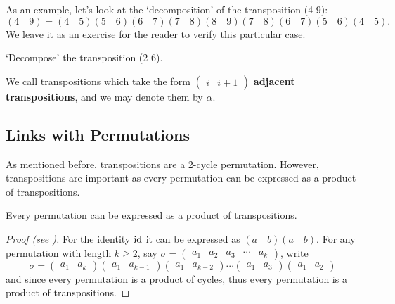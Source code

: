\begin{example}
    As an example, let's look at the `decomposition' of the transposition (4 9):
    \[
        (4\quad 9) = (4\quad 5)(5\quad 6)(6\quad 7)(7\quad 8)(8\quad 9)(7\quad 8)(6\quad 7)(5\quad 6)(4\quad 5).
    \]
    We leave it as an exercise for the reader to verify this particular case.
\end{example}
\begin{exercise}
    `Decompose' the transposition (2 6).
\end{exercise}
\begin{remark}
    We call transpositions which take the form $\begin{pmatrix}i&i+1\end{pmatrix}$ \textbf{adjacent transpositions}, and we may denote them by $\alpha$.
\end{remark}

\subsection{Links with Permutations}
As mentioned before, transpositions are a 2-cycle permutation. However, transpositions are important as every permutation can be expressed as a product of transpositions.
\begin{lemma}\label{lemma-permutations-as-product-of-transpositions}
    Every permutation can be expressed as a product of transpositions.
\end{lemma}
\begin{proof}[Proof (see {\cite[\S 80 Corollary]{clark_1984}})]
    For the identity $\mathrm{id}$ it can be expressed as $(a\quad b)(a \quad b)$. For any permutation with length $k \geq 2$, say $\sigma = \begin{pmatrix}a_1 & a_2 & a_3 & \cdots & a_k\end{pmatrix}$, write
    \[
        \sigma = \begin{pmatrix}a_1 & a_k\end{pmatrix}\begin{pmatrix}a_1 & a_{k-1}\end{pmatrix}\begin{pmatrix}a_1 & a_{k-2}\end{pmatrix}\cdots\begin{pmatrix}a_1 & a_3\end{pmatrix}\begin{pmatrix}a_1 & a_2\end{pmatrix}
    \]
    and since every permutation is a product of cycles, thus every permutation is a product of transpositions.
\end{proof}

